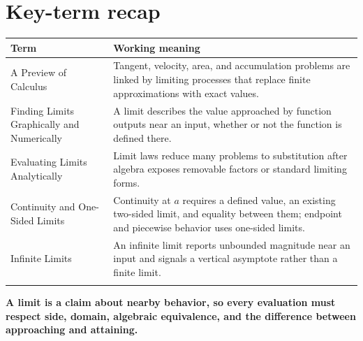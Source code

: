 \documentclass[11pt]{article}
\begin{document}
\normalsize

\section{Key-term recap}
\small
\begin{longtable}{@{}>{\RaggedRight\arraybackslash}p{}>{\RaggedRight\arraybackslash}p{}@{}}
\toprule
\textbf{Term} & \textbf{Working meaning}\\
\midrule\endhead
A Preview of Calculus & Tangent, velocity, area, and accumulation problems are linked by limiting processes that replace finite approximations with exact values. \\\addlinespace[2pt]
Finding Limits Graphically and Numerically & A limit describes the value approached by function outputs near an input, whether or not the function is defined there. \\\addlinespace[2pt]
Evaluating Limits Analytically & Limit laws reduce many problems to substitution after algebra exposes removable factors or standard limiting forms. \\\addlinespace[2pt]
Continuity and One-Sided Limits & Continuity at $a$ requires a defined value, an existing two-sided limit, and equality between them; endpoint and piecewise behavior uses one-sided limits. \\\addlinespace[2pt]
Infinite Limits & An infinite limit reports unbounded magnitude near an input and signals a vertical asymptote rather than a finite limit. \\\addlinespace[2pt]
\bottomrule
\end{longtable}
\normalsize

\enlargethispage{4\baselineskip}
\begin{tcolorbox}[title=One-sentence takeaway,fonttitle=\bfseries,colback=Ink,colframe=Ink,coltext=white,coltitle=white,arc=2mm,boxrule=0pt]
\centering\bfseries A limit is a claim about nearby behavior, so every evaluation must respect side, domain, algebraic equivalence, and the difference between approaching and attaining.
\end{tcolorbox}
\end{document}
